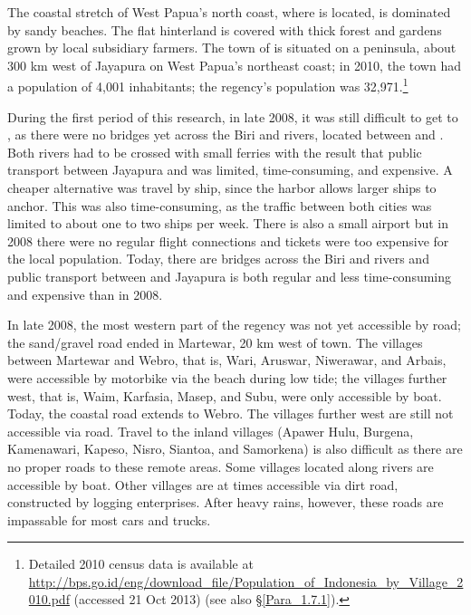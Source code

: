 {The coastal stretch of West Papua’s north coast, where  is located, is dominated by sandy beaches. The flat hinterland is covered with thick forest and gardens grown by local subsidiary farmers. The town of  is situated on a peninsula, about 300 km west of Jayapura on West Papua’s northeast coast; in 2010, the town had a population of 4,001 inhabitants; the regency’s population was 32,971.\footnote{Detailed 2010 census data is available at \url{http://bps.go.id/eng/download_file/Population_of_Indonesia_by_Village_2010.pdf} (accessed 21 Oct 2013) (see also §\ref{Para_1.7.1}).}


During the first period of this research, in late 2008, it was still difficult to get to , as there were no bridges yet across the Biri and  rivers, located between  and . Both rivers had to be crossed with small ferries with the result that public transport between Jayapura and  was limited, time-consuming, and expensive. A cheaper alternative was travel by ship, since the  harbor allows larger ships to anchor. This was also time-consuming, as the traffic between both cities was limited to about one to two ships per week. There is also a small airport but in 2008 there were no regular flight connections and tickets were too expensive for the local population. Today, there are bridges across the Biri and  rivers and public transport between  and Jayapura is both regular and less time-consuming and expensive than in 2008.



In late 2008, the most western part of the  regency was not yet accessible by road; the sand/gravel road ended in Martewar, 20 km west of  town. The villages between Martewar and Webro, that is, Wari, Aruswar, Niwerawar, and Arbais, were accessible by motorbike via the beach during low tide; the villages further west, that is, Waim, Karfasia, Masep, and Subu, were only accessible by boat. Today, the coastal road extends to Webro. The villages further west are still not accessible via road. Travel to the inland villages (Apawer Hulu, Burgena, Kamenawari, Kapeso, Nisro, Siantoa, and Samorkena) is also difficult as there are no proper roads to these remote areas. Some villages located along rivers are accessible by boat. Other villages are at times accessible via dirt road, constructed by logging enterprises. After heavy rains, however, these roads are impassable for most cars and trucks.



}
